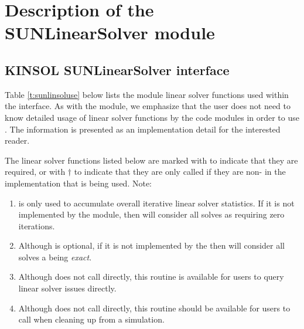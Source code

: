 \chapter{Description of the SUNLinearSolver module}\label{s:sunlinsol}



\section{KINSOL SUNLinearSolver interface}
\label{s:sunlinsol_interface}

Table \ref{t:sunlinsoluse} below lists the {\sunlinsol} module linear solver
functions used within the {\kinls} interface. As with the {\sunmatrix} module, we
emphasize that the {\kinsol} user does not need to know detailed usage of linear
solver functions by the {\kinsol} code modules in order to use {\kinsol}. The
information is presented as an implementation detail for the interested reader.

The linear solver functions listed below are marked with \cm to
indicate that they are required, or with $\dagger$ to indicate that
they are only called if they are non- in the {\sunlinsol}
implementation that is being used. Note:
\begin{enumerate}
\item {} is only used to accumulate overall
  iterative linear solver statistics.  If it is not implemented by
  the {\sunlinsol} module, then {\kinls} will consider all solves as
  requiring zero iterations.
\item Although  is optional, if it is not
  implemented by the {\sunlinsol} then {\kinls} will consider all 
   solves a being \emph{exact}.
\item Although {\kinls} does not call 
  directly, this routine is available for users to query linear solver
  issues directly.
\item Although {\kinls} does not call 
  directly, this routine should be available for users to call when
  cleaning up from a simulation.
\end{enumerate}

